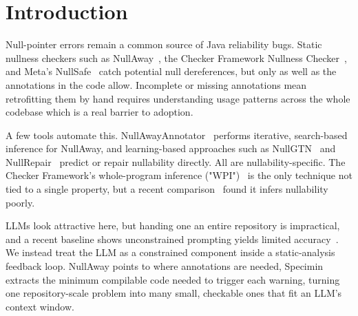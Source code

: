 \documentclass[sigplan,screen]{acmart}
\begin{document}



\maketitle

\section{Introduction}

Null-pointer errors remain a common source of Java reliability bugs. Static nullness checkers such as NullAway~\cite{banerjee2019nullaway}, the Checker Framework Nullness Checker~\cite{papi2008practical}, and Meta's NullSafe~\cite{meta_nullsafe} catch potential null dereferences, but only as well as the annotations in the code allow. Incomplete or missing annotations mean retrofitting them by hand requires understanding usage patterns across the whole codebase which is a real barrier to adoption.

A few tools automate this. NullAwayAnnotator~\cite{karimipour2023practical} performs iterative, search-based inference for NullAway, and learning-based approaches such as NullGTN~\cite{siddiqui2024inferring} and NullRepair~\cite{karimipour2025llm} predict or repair nullability directly. All are nullability-specific. The Checker Framework's whole-program inference ("WPI")~\cite{kellogg2023pluggable} is the only technique not tied to a single property, but a recent comparison~\cite{karimipour2025new} found it infers nullability poorly.

LLMs look attractive here, but handing one an entire repository is impractical, and a recent baseline shows unconstrained prompting yields limited accuracy~\cite{karimipour2025llm}. We instead treat the LLM as a constrained component inside a static-analysis feedback loop. NullAway points to where annotations are needed, Specimin~\cite{nguyen2025static} extracts the minimum compilable code needed to trigger each warning, turning one repository-scale problem into many small, checkable ones that fit an LLM's context window. 
\end{document}
